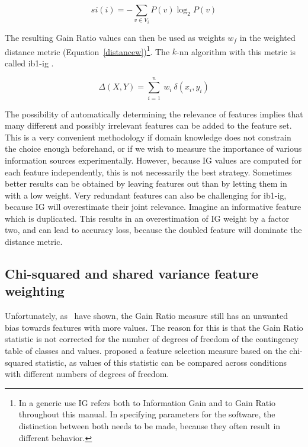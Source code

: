 \documentclass{book}
\begin{document}
\begin{equation}
si(i) = - \sum_{v \in V_{i}} P(v) \log_{2} P(v)
\label{splitinfo}
\end{equation}

The resulting Gain Ratio values can then be used as weights $w_{f}$ in
the weighted distance metric (Equation~\ref{distancew})\footnote{In a
generic use IG refers both to Information Gain and to Gain Ratio
throughout this manual. In specifying parameters for the software, the
distinction between both needs to be made, because they often result
in different behavior.}. The $k$-{\sc nn} algorithm with this
metric is called {\sc ib1-ig} \cite{Daelemans+92b}.

\begin{equation}
\Delta(X,Y) = \sum_{i=1}^{n}\ w_{i} \ \delta(x_{i},y_{i})
\label{distancew}
\end{equation}

The possibility of automatically determining the relevance of features
implies that many different and possibly irrelevant features can be
added to the feature set. This is a very convenient methodology if
domain knowledge does not constrain the choice enough beforehand, or
if we wish to measure the importance of various information sources
experimentally. However, because IG values are computed for each
feature independently, this is not necessarily the best
strategy. Sometimes better results can be obtained by leaving features
out than by letting them in with a low weight. Very redundant features
can also be challenging for {\sc ib1-ig}, because IG will overestimate
their joint relevance. Imagine an informative feature which is
duplicated. This results in an overestimation of IG weight by a factor
two, and can lead to accuracy loss, because the doubled feature will
dominate the distance metric.

\subsection{Chi-squared and shared variance feature weighting}
\label{chisquared}

Unfortunately, as~ have shown, the Gain Ratio measure
still has an unwanted bias towards features with more values. The
reason for this is that the Gain Ratio statistic is not corrected for
the number of degrees of freedom of the contingency table of classes
and values.  proposed a feature selection measure based
on the chi-squared statistic, as values of this statistic can be
compared across conditions with different numbers of degrees of
freedom.
\end{document}
